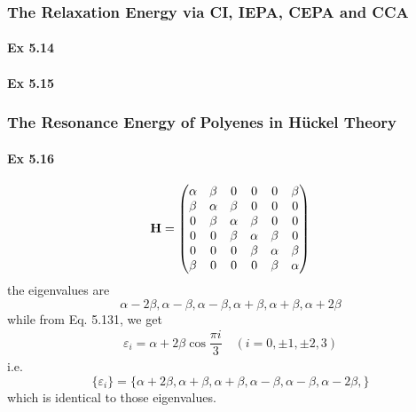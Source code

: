 \documentclass[a4paper]{article}
\newcommand{\ex}[1]{\paragraph{Ex #1}}
\numberwithin{equation}{subsection}
\begin{document}
\subsubsection{The Relaxation Energy via CI, IEPA, CEPA and CCA}
\ex{5.14}






\ex{5.15}

\subsubsection{The Resonance Energy of Polyenes in H\"uckel Theory}
\ex{5.16}
\begin{align}
\vb{H} = 
\mqty(\alpha & \beta & 0 & 0 & 0 & \beta\\
      \beta & \alpha & \beta & 0 & 0 & 0 \\
      0 & \beta & \alpha & \beta & 0 & 0 \\
      0 & 0 & \beta & \alpha & \beta & 0 \\
      0 & 0 & 0 & \beta & \alpha & \beta \\
      \beta & 0 & 0 & 0 & \beta & \alpha \\
      )
\end{align}
the eigenvalues are
\begin{equation}\label{key}
\alpha - 2\beta, \alpha - \beta, \alpha - \beta, \alpha + \beta, \alpha + \beta, \alpha + 2\beta
\end{equation}
while from Eq. 5.131, we get 
\begin{align}
\varepsilon_i = \alpha + 2\beta\cos\dfrac{\pi i}{3} \quad (i=0,\pm 1, \pm 2, 3)
\end{align}
i.e.
\begin{equation}\label{key}
\{\varepsilon_i\} = \{\alpha+2\beta, \alpha + \beta, \alpha + \beta, \alpha - \beta, \alpha - \beta, \alpha - 2\beta, \}
\end{equation}
which is identical to those eigenvalues.
\end{document}
